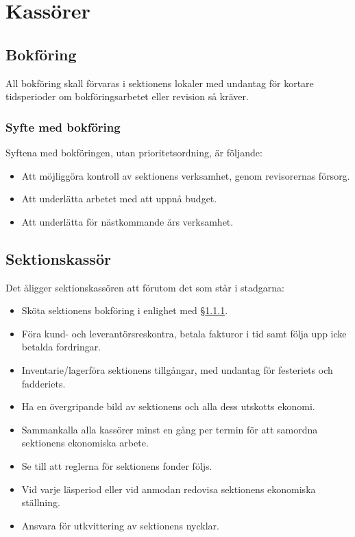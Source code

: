 \documentclass{datateknologsektionen-document}
\begin{document}
\section{Kassörer}
\subsection{Bokföring}
All bokföring skall förvaras i sektionens lokaler med undantag för kortare tidsperioder om bokföringsarbetet eller revision så kräver.
\subsubsection{Syfte med bokföring}
\label{bokforingssyfte}
Syftena med bokföringen, utan prioritetsordning, är följande:
\begin{itemize}
  \item Att möjliggöra kontroll av sektionens verksamhet, genom revisorernas försorg.
  \item Att underlätta arbetet med att uppnå budget.
  \item Att underlätta för nästkommande års verksamhet.
\end{itemize}
\subsection{Sektionskassör}
\label{sektionskassor}
Det åligger sektionskassören att förutom det som står i stadgarna:
\begin{itemize}
  \item Sköta sektionens bokföring i enlighet med \S \ref{bokforingssyfte}.
  \item Föra kund- och leverantörsreskontra, betala fakturor i tid samt följa upp icke betalda fordringar.
  \item Inventarie/lagerföra sektionens tillgångar, med undantag för festeriets och fadderiets.
  \item Ha en övergripande bild av sektionens och alla dess utskotts ekonomi.
  \item Sammankalla alla kassörer minst en gång per termin för att samordna sektionens ekonomiska arbete.
  \item Se till att reglerna för sektionens fonder följs.
  \item Vid varje läsperiod eller vid anmodan redovisa sektionens ekonomiska ställning.
  \item Ansvara för utkvittering av sektionens nycklar.
\end{itemize}
\end{document}

